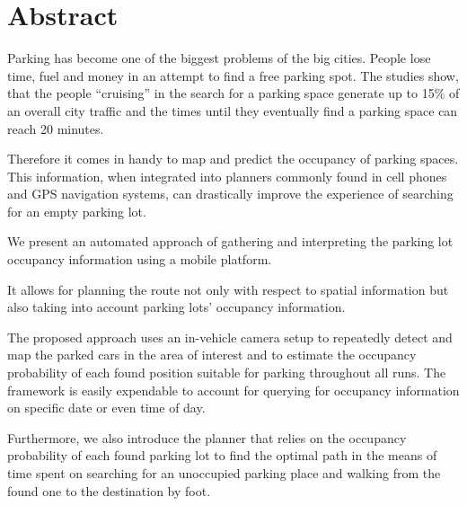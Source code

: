 \chapter*{Abstract}
\label{cha:abstract}

Parking has become one of the biggest problems of the big cities. People lose
time, fuel and money in an attempt to find a free parking spot. The studies
show, that the people ``cruising'' in the search for a parking space generate
up to 15\% of an overall city traffic and the times until they eventually find
a parking space can reach 20 minutes.

Therefore it comes in handy to map and predict the occupancy of parking
spaces. This information, when integrated into planners commonly found in cell
phones and GPS navigation systems, can drastically improve the experience of
searching for an empty parking lot.

We present an automated approach of gathering and interpreting the parking lot
occupancy information using a mobile platform.

It allows for planning the route not only with respect to spatial information
but also taking into account parking lots' occupancy information.

The proposed approach uses an in-vehicle camera setup to repeatedly detect and
map the parked cars in the area of interest and to estimate the occupancy
probability of each found position suitable for parking throughout all runs.
The framework is easily expendable to account for querying for occupancy
information on specific date or even time of day.

Furthermore, we also introduce the planner that relies on the occupancy
probability of each found parking lot to find the optimal path in the means of
time spent on searching for an unoccupied parking place and walking from the
found one to the destination by foot.



